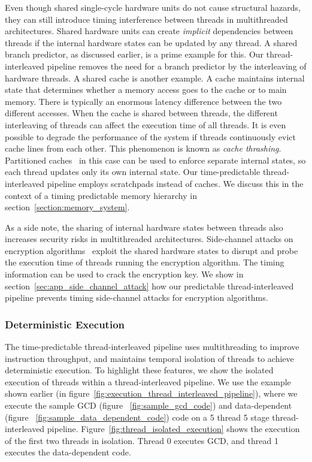 Even though shared single-cycle hardware units do not cause structural hazards, they can still introduce timing interference between threads in multithreaded architectures. 
Shared hardware units can create \emph{implicit} dependencies between threads if the internal hardware states can be updated by any thread. 
A shared branch predictor, as discussed earlier, is a prime example for this. 
Our thread-interleaved pipeline removes the need for a branch predictor by the interleaving of hardware threads.  
A shared cache is another example.   
A cache maintains internal state that determines whether a memory access goes to the cache or to main memory.
There is typically an enormous latency difference between the two different accesses.
When the cache is shared between threads, the different interleaving of threads can affect the execution time of all threads. 
It is even possible to degrade the performance of the system if threads continuously evict cache lines from each other. 
This phenomenon is known as \emph{cache thrashing}.
Partitioned caches~\cite{cachepartition} in this case can be used to enforce separate internal states, so each thread updates only its own internal state.  
Our time-predictable thread-interleaved pipeline employs scratchpads instead of caches.
We discuss this in the context of a timing predictable memory hierarchy in section~\ref{section:memory_system}.   

As a side note, the sharing of internal hardware states between threads also increases security risks in multithreaded architectures. 
Side-channel attacks on encryption algorithms~\cite{Kelsey98sidechannel} exploit the shared hardware states to disrupt and probe the execution time of threads running the encryption algorithm.
The timing information can be used to crack the encryption key.
We show in section~\ref{sec:app_side_channel_attack} how our predictable thread-interleaved pipeline prevents timing side-channel attacks for encryption algorithms.   

\subsubsection{Deterministic Execution}
The time-predictable thread-interleaved pipeline uses multithreading to improve instruction throughput, and maintains temporal isolation of threads to achieve deterministic execution.  
To highlight these features, we show the isolated execution of threads within a thread-interleaved pipeline.
We use the example shown earlier (in figure~\ref{fig:execution_thread_interleaved_pipeline}), where we execute the sample GCD (figure ~\ref{fig:sample_gcd_code}) and data-dependent (figure ~\ref{fig:sample_data_dependent_code}) code on a 5 thread 5 stage thread-interleaved pipeline.   
Figure~\ref{fig:thread_isolated_execution} shows the execution of the first two threads in isolation. 
Thread 0 executes GCD, and thread 1 executes the data-dependent code.

